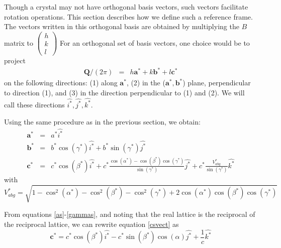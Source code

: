 \documentclass[prb]{revtex4}%
\begin{document}
Though a crystal may not have orthogonal basis vectors, such vectors facilitate
rotation operations. This section describes
how we define such a reference frame.
The vectors written in this orthogonal basis are
obtained by multiplying the $B$ matrix to  $\left(\begin{array}{c}
                                                            h \\
                                                            k \\
                                                            l
                                                          \end{array}\right)$
For an orthogonal
set of basis vectors, one choice would be to project
\begin{eqnarray}
    \textbf{Q}/(2\pi) &=&  h \textbf{a}^* + k \textbf{b}^*+ l \textbf{c}^*
\end{eqnarray}
on the following directions: (1) along $\textbf{a}^*$, (2) in the ($\textbf{a}^*,\textbf{b}^*$)
plane, perpendicular to direction (1), and (3) in the direction perpendicular to (1) and (2). We will call
these directions $\widehat{i^*}, \widehat{j^*}, \widehat{k^*}$.

Using the same procedure as in the previous section, we obtain:
\begin{eqnarray}
  \textbf{a}^* &=& a^*\widehat{i^*}\label{asvect}\\
  \textbf{b}^* &=& b^* \cos(\gamma^*) \widehat{i^*} + b^* \sin(\gamma^*) \widehat{j^*}\label{bsvect}\\
  \textbf{c}^* &=& c^* \cos(\beta^*) \widehat{i^*} + c^* \frac{\cos(\alpha^*)-\cos(\beta^*)\cos(\gamma^*)}{\sin(\gamma^*)}\widehat{j^*}+
  c^* \frac{V_{abg}^*}{\sin(\gamma^*)}\widehat{k^*}\label{csvect}
\end{eqnarray}
\noindent with
\begin{equation}
    V_{abg}^* = \sqrt{1-\cos^2(\alpha^*)-\cos^2(\beta^*)-\cos^2(\gamma^*)+2 \cos(\alpha^*) \cos(\beta^*) \cos(\gamma^*)}
\end{equation}

From equations \ref{as}-\ref{gammas}, and noting that the real lattice is the reciprocal of the reciprocal lattice, we can rewrite equation \ref{csvect} as
\begin{equation}
    \textbf{c}^* = c^* \cos(\beta^*) \widehat{i^*} - c^* \sin(\beta^*) \cos(\alpha)\widehat{j^*} +
    \frac{1}{c}\widehat{k^*}
\end{equation}
\end{document}
